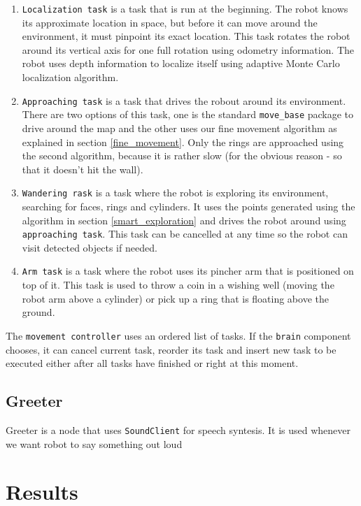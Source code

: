 \documentclass[12pt,a4paper]{article}
\begin{document}
	\begin{enumerate}
		\item \texttt{Localization task} is a task that is run at the beginning. The robot knows its approximate location in space, but before it can move around the environment, it must pinpoint its exact location. This task rotates the robot around its vertical axis for one full rotation using odometry information. The robot uses depth information to localize itself using adaptive Monte Carlo localization algorithm.
		\item \texttt{Approaching task} is a task that drives the robout around its environment. There are two options of this task, one is the standard \texttt{move\_base} package to drive around the map and the other uses our fine movement algorithm as explained in section \ref{fine_movement}. Only the rings are approached using the second algorithm, because it is rather slow (for the obvious reason - so that it doesn't hit the wall).
		\item \texttt{Wandering rask} is a task where the robot is exploring its environment, searching for faces, rings and cylinders. It uses the points generated using the algorithm in section \ref{smart_exploration} and drives the robot around using \texttt{approaching task}. This task can be cancelled at any time so the robot can visit detected objects if needed.
		\item \texttt{Arm task} is a task where the robot uses its pincher arm that is positioned on top of it. This task is used to throw a coin in a wishing well (moving the robot arm above a cylinder) or pick up a ring that is floating above the ground.
	\end{enumerate}

	The \texttt{movement controller} uses an ordered list of tasks. If the \texttt{brain} component chooses, it can cancel current task, reorder its task and insert new task to be executed either after all tasks have finished or right at this moment. \\ 
	
	\subsection{Greeter}
	Greeter is a node that uses \texttt{SoundClient} for speech syntesis. It is used whenever we want robot to say something out loud
	
	\section{Results}
\end{document}
